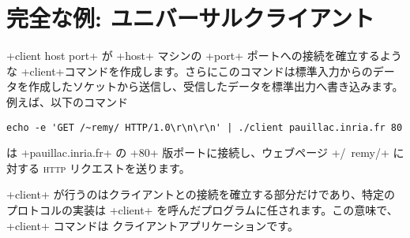 \section{\label{sec/univclient}完全な例: ユニバーサルクライアント}

\ml+client host port+ が \ml+host+ マシンの \ml+port+ ポートへの接続を確立するような \ml+client+コマンドを作成します。さらにこのコマンドは標準入力からのデータを作成したソケットから送信し、受信したデータを標準出力へ書き込みます。例えば、以下のコマンド
\begin{lstlisting}
echo -e 'GET /~remy/ HTTP/1.0\r\n\r\n' | ./client pauillac.inria.fr 80
\end{lstlisting}
は \ml+pauillac.inria.fr+ の \ml+80+ 版ポートに接続し、ウェブページ \ml+/~remy/+ に対する \textsc{http} リクエストを送ります。

\ml+client+ が行うのはクライアントとの接続を確立する部分だけであり、特定のプロトコルの実装は \ml+client+ を呼んだプログラムに任されます。この意味で、 \ml+client+ コマンドは  クライアントアプリケーションです。

